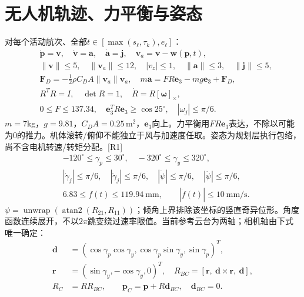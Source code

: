 \section{无人机轨迹、力平衡与姿态}
\noindent 对每个活动航次、全部$t\in[\max(s_\ell,\tau_k),e_\ell]$：
\begin{align}
 &\dot{\mathbf p}=\mathbf v,\quad\dot{\mathbf v}=\mathbf a,\quad
 \dot{\mathbf a}=\mathbf j,\quad\mathbf v_a=\mathbf v-\mathbf w(\mathbf p,t),\\
 &\|\mathbf v\|\le5,\quad\|\mathbf v_a\|\le12,\quad |v_z|\le1,\quad
 \|\mathbf a\|\le3,\quad\|\mathbf j\|\le5,\label{eng:eq:kinematic}\\
 &\mathbf F_D=-\tfrac12\rho C_DA\|\mathbf v_a\|\mathbf v_a,\quad
 m\mathbf a=F R\mathbf e_3-mg\mathbf e_3+\mathbf F_D,\\
 &R^TR=I,\quad\det R=1,\quad \dot R=R[\boldsymbol\omega]_\times,\\
 &0\le F\le137.34,\quad\mathbf e_3^TR\mathbf e_3\ge\cos25^\circ,
       \quad |\omega_j|\le\pi/6.
 \label{eng:eq:attitude}
\end{align}
\noindent $m=7$kg，$g=9.81$，$C_DA=0.25\,\mathrm{m}^2$，$\mathbf e_3$向上。力平衡用$FR\mathbf e_3$表达，不除以可能为0的推力。机体滚转/俯仰不能独立于风与加速度任取。姿态为规划层执行包络，尚不含电机转速/转矩分配。[R1]
\begin{align}
 &-120^\circ\le\gamma_p\le30^\circ,\quad
 -320^\circ\le\gamma_y\le320^\circ,\\
 &|\dot\gamma_j|\le\pi/6,\quad|\ddot\gamma_j|\le\pi/6,\quad
 |\dot\psi|\le\pi/6,\quad|\ddot\psi|\le\pi/6,\\
 &6.83\le f(t)\le119.94\ \mathrm{mm},\qquad |\dot f(t)|\le10\ \mathrm{mm/s}.
 \label{eng:eq:gimbal}
\end{align}
\noindent $\psi=\operatorname{unwrap}(\operatorname{atan2}(R_{21},R_{11}))$；倾角上界排除该坐标的竖直奇异位形。角度函数连续展开，不以$2\pi$跳变绕过速率限值。当前参考云台为两轴；相机轴由下式唯一确定：
\begin{align}
 \mathbf d&=(\cos\gamma_p\cos\gamma_y,\cos\gamma_p\sin\gamma_y,\sin\gamma_p)^T,\\
 \mathbf r&=(\sin\gamma_y,-\cos\gamma_y,0)^T,\quad
 R_{BC}=[\mathbf r,\ \mathbf d\times\mathbf r,\ \mathbf d],\\
 R_C&=RR_{BC},\qquad \mathbf p_C=\mathbf p+R\mathbf d_{BC},\quad\mathbf d_{BC}=0.
 \label{eng:eq:cameraaxes}
\end{align}
\clearpage

